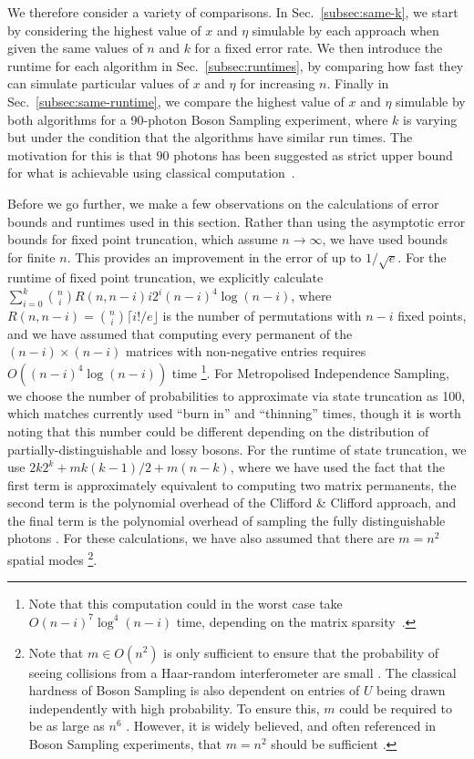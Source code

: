 We therefore consider a variety of comparisons. 
In Sec.\ \ref{subsec:same-k}, we start by considering the highest value of $x$ and $\eta$ simulable by each approach when given the same values of $n$ and $k$ for a fixed error rate. 
We then introduce the runtime for each algorithm in Sec.\ \ref{subsec:runtimes}, by comparing how fast they can simulate particular values of $x$ and $\eta$ for increasing $n$. 
Finally in Sec.\ \ref{subsec:same-runtime}, we compare the highest value of $x$ and $\eta$ simulable by both algorithms for a 90-photon Boson Sampling experiment, where $k$ is varying but under the condition that the algorithms have similar run times. The motivation for this is that $90$ photons has been suggested as strict upper bound for what is achievable using classical computation~\cite{dalzell2018}.

Before we go further, we make a few observations on the calculations of error bounds and runtimes used in this section. 
Rather than using the asymptotic error bounds for fixed point truncation, which assume $n\rightarrow\infty$, we have used bounds for finite $n$. 
This provides an improvement in the error of up to $1/\sqrt{e}$. 
For the runtime of fixed point truncation, we explicitly calculate $\sum_{i=0}^k\binom{n}{i}R(n,n-i)i2^i(n-i)^4\log(n-i)$, where $R(n,n-i)=\binom{n}{i}\lceil i!/e\rfloor$ is the number of permutations with $n-i$ fixed points, and we have assumed that computing every permanent of the $(n-i)\times(n-i)$ matrices with non-negative entries requires $O((n-i)^4\log(n-i))$ time
\footnote{Note that this computation could in the worst case take $O(n-i)^7\log^4(n-i)$ time, depending on the matrix sparsity~\cite{huber2008}.}. 
For Metropolised Independence Sampling, we choose the number of probabilities to approximate via state truncation as 100, which matches currently used ``burn in'' and ``thinning'' times\cite{neville2017}, though it is worth noting that this number could be different depending on the distribution of partially-distinguishable and lossy bosons. 
For the runtime of state truncation, we use $2k2^k + mk(k-1)/2 + m(n-k)$, where we have used the fact that the first term is approximately equivalent to computing two matrix permanents, the second term is the polynomial overhead of the Clifford \& Clifford approach, and the final term is the polynomial overhead of sampling the fully distinguishable photons \cite{clifford2017}. 
For these calculations, we have also assumed that there are $m=n^2$ spatial modes
\footnote{Note that $m\in O(n^2)$ is only sufficient to ensure that the probability of seeing collisions from a Haar-random interferometer are small \cite{arkhipov2011}. 
The classical hardness of Boson Sampling is also dependent on entries of $U$ being drawn independently with high probability. 
To ensure this, $m$ could be required to be as large as $n^6$ \cite{aaronson2011}. 
However, it is widely believed, and often referenced in Boson Sampling experiments, that $m=n^2$ should be sufficient \cite{aaronson2011,broome2013, spring2013, tillmann2013, crespi2013,carolan2015,wang2017,zhong2018}.}.

